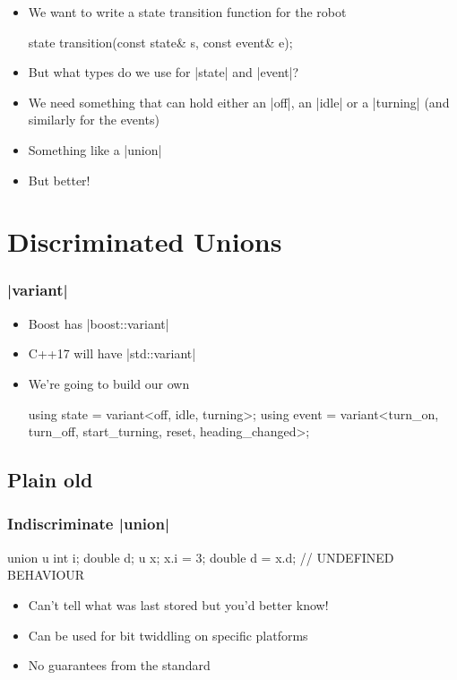 \documentclass[aspectratio=169]{beamer}
\begin{document}
\begin{frame}[fragile]
  \begin{itemize}
  \item We want to write a state transition function for the robot
\begin{cppcode}
state transition(const state& s, const event& e);
\end{cppcode}
  \item But what types do we use for \cpp|state| and \cpp|event|?
  \item We need something that can hold \alert{either} an \cpp|off|, an
    \cpp|idle| or a \cpp|turning| (and similarly for the events)
  \item Something like a \cpp|union|
  \item But better!
  \end{itemize}
\end{frame}


\section{Discriminated Unions}

\begin{frame}[fragile]
  \frametitle{\cpp|variant|}
  \begin{itemize}
  \item Boost has \cpp|boost::variant|
  \item C++17 will have \cpp|std::variant|
  \item We're going to build our own
\begin{cppcode}
using state = variant<off, idle, turning>;
using event =
    variant<turn_on, turn_off, start_turning, reset,
            heading_changed>;
\end{cppcode}
  \end{itemize}
\end{frame}

\subsection{Plain old }

\begin{frame}[fragile]
  \frametitle{Indiscriminate \cpp|union|}
\begin{cppcode}
    union u {
      int i;
      double d;
    }
    u x;
    x.i = 3;
    double d = x.d; // UNDEFINED BEHAVIOUR
\end{cppcode}
  \begin{itemize}
  \item Can't tell what was last stored but you'd better know!
  \item Can be used for bit twiddling on specific platforms
  \item No guarantees from the standard
  \end{itemize}
\end{frame}
\end{document}
